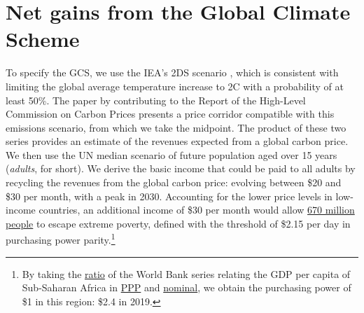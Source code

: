 \clearpage
\section{Net gains from the Global Climate Scheme}\label{app:gain_gcs}

To specify the GCS, we use the IEA's 2DS scenario \citep{iea_energy_2017}, which is consistent with limiting the global average temperature increase to 2\textdegree{}C with a probability of at least 50\%. The paper by \citet{hood_input_2017} contributing to the Report of the High-Level Commission on Carbon Prices \citep{stern_report_2017} presents a price corridor compatible with this emissions scenario, from which we take the midpoint. The product of these two series provides an estimate of the revenues expected from a global carbon price. We then use the UN median scenario of future population aged over 15 years (\textit{adults}, for short). We derive the basic income that could be paid to all adults by recycling the revenues from the global carbon price: evolving between \$20 and \$30 per month, with a peak in 2030. Accounting for the lower price levels in low-income countries, an additional income of \$30 per month would allow \href{https://data.worldbank.org/indicator/SI.POV.DDAY}{670 million people} to escape extreme poverty, defined with the threshold of \$2.15 per day in purchasing power parity.\footnote{By taking the \href{https://data.worldbank.org/indicator/PA.NUS.PPPC.RF}{ratio} of the World Bank series relating the GDP per capita of Sub-Saharan Africa in \href{https://data.worldbank.org/indicator/NY.GDP.PCAP.PP.KD?locations=ZG&year_high_desc=true}{PPP} and \href{https://data.worldbank.org/indicator/NY.GDP.PCAP.KD?locations=ZG&year_high_desc=true}{nominal}, we obtain the purchasing power of \$1 in this region: \$2.4 in 2019. %
} 

